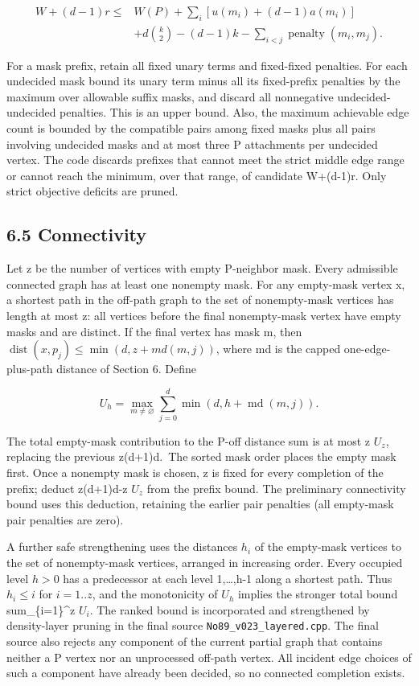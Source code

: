 \documentclass[
  11pt,
]{article}
\begin{document}
\[\begin{aligned}W+(d-1)r\le{}& W(P)+\sum_i[u(m_i)+(d-1)a(m_i)]\\&+d\binom{k}{2}-(d-1)k-\sum_{i<j}\operatorname{penalty}(m_i,m_j).\end{aligned}\]

For a mask prefix, retain all fixed unary terms and fixed-fixed
penalties. For each undecided mask bound its unary term minus all its
fixed-prefix penalties by the maximum over allowable suffix masks, and
discard all nonnegative undecided-undecided penalties. This is an upper
bound. Also, the maximum achievable edge count is bounded by the
compatible pairs among fixed masks plus all pairs involving undecided
masks and at most three P attachments per undecided vertex. The code
discards prefixes that cannot meet the strict middle edge range or
cannot reach the minimum, over that range, of candidate W+(d-1)r. Only
strict objective deficits are pruned.

\subsection{6.5 Connectivity}\label{connectivity}

Let z be the number of vertices with empty P-neighbor mask. Every
admissible connected graph has at least one nonempty mask. For any
empty-mask vertex x, a shortest path in the off-path graph to the set of
nonempty-mask vertices has length at most z: all vertices before the
final nonempty-mask vertex have empty masks and are distinct. If the
final vertex has mask m, then
\(\operatorname{dist}(x,p_{j})\le \operatorname{min}(d,z+md(m,j))\),
where md is the capped one-edge-plus-path distance of Section 6. Define

\[U_h=\max_{m\ne\varnothing}\sum_{j=0}^d\min(d,h+\operatorname{md}(m,j)).\]

The total empty-mask contribution to the P-off distance sum is at most z
\(U_{z}\), replacing the previous z(d+1)d.~The sorted mask order places
the empty mask first. Once a nonempty mask is chosen, z is fixed for
every completion of the prefix; deduct z(d+1)d-z \(U_{z}\) from the
prefix bound. The preliminary connectivity bound uses this deduction,
retaining the earlier pair penalties (all empty-mask pair penalties are
zero).

A further safe strengthening uses the distances \(h_{i}\) of the
empty-mask vertices to the set of nonempty-mask vertices, arranged in
increasing order. Every occupied level \(h>0\) has a predecessor at each
level 1,\ldots,h-1 along a shortest path. Thus \(h_{i}\le i\) for
\(i=1..z\), and the monotonicity of \(U_{h}\) implies the stronger total
bound sum\_\{i=1\}\^{}z \(U_{i}\). The ranked bound is incorporated and
strengthened by density-layer pruning in the final source
\texttt{No89\_v023\_layered.cpp}. The final source also rejects any
component of the current partial graph that contains neither a P vertex
nor an unprocessed off-path vertex. All incident edge choices of such a
component have already been decided, so no connected completion exists.
\end{document}
